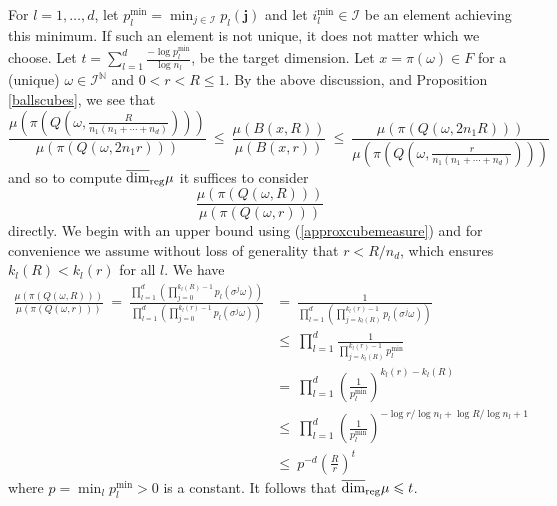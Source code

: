 \documentclass[12pt]{amsart}
\numberwithin{equation}{section}
\renewcommand{\le}{\leqslant}
\renewcommand{\leq}{\leqslant}
\renewcommand{\r}{\overline{\dim}_{\textup{reg}} \mu}
\begin{document}
For  $l=1,\ldots, d$, let $p_l^{\text{min}}=\min_{j\in \mathcal{I}} p_l(\mathbf{j})$  and let  $i_l^{\min} \in \mathcal{I}$ be an element achieving this minimum.  If such an element is not unique,  it does not matter which we choose.  Let $t=\sum_{l=1}^d\frac{-\log p_l^{\text{min}}}{\log n_l}$, be the target dimension.  Let $x= \pi(\omega) \in F$ for a (unique) $\omega \in \mathcal{I}^{\mathbb{N}}$ and $0<r<R\le 1$. By the above discussion, and Proposition \ref{ballscubes}, we see that
\[
\frac{\mu \left(\pi \left(Q\left(\omega,\frac{R}{n_1(n_1+ \cdots + n_d)}\right)\right)\right)} {\mu(\pi(Q(\omega,2n_1 r)))} \ \leq \  \frac{\mu(B(x,R))}{\mu(B(x,r))}  \ \leq \ \frac{\mu(\pi(Q(\omega,2n_1 R)))}{\mu \left(\pi \left(Q\left(\omega,\frac{r}{n_1(n_1+ \cdots + n_d)}\right)\right)\right)}
\]
and so to compute  $\r $ it suffices to consider 
\[
\frac{\mu(\pi(Q(\omega,R)))}{\mu(\pi(Q(\omega,r)))} 
\]
directly.  We begin with an upper bound using (\ref{approxcubemeasure}) and for convenience we assume without loss of generality that $r < R/ n_d$, which ensures $k_l(R) < k_l(r)$ for all $l$.  We have
\begin{align*}
\frac{\mu(\pi(Q(\omega,R)))}{\mu(\pi(Q(\omega,r)))} \ = \ \frac{\prod_{l=1}^d\left(\prod_{j=0}^{k_l(R)-1}p_l(\sigma^j \omega) \right)}{\prod_{l=1}^d\left(\prod_{j=0}^{k_l(r)-1}p_l(\sigma^j \omega) \right)}  & = \ \frac{1}{\prod_{l=1}^d\left(\prod_{j=k_l(R)}^{k_l(r)-1}p_l(\sigma^j \omega) \right)} \\
& \le\  \prod_{l=1}^d \frac{1}{\prod_{j=k_l(R)}^{k_l(r)-1}p_l^{\text{min}}} \\
& =\  \prod_{l=1}^d\left( \frac{1}{p_l^{\text{min}}}\right)^{k_l(r)-k_l(R)} \\
& \le\  \prod_{l=1}^d \left( \frac{1}{p_l^{\text{min}}}\right)^{-\log r/\log n_l + \log R/\log n_l + 1}  \\
& \le \ p^{-d} \left( \frac{R}{r} \right)^{t}
\end{align*}
where $p = \min_l p_l^{\text{min}}>0$ is a constant. It follows that $\r \le t$.
\end{document}
